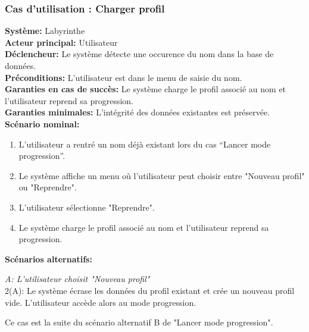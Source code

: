 \documentclass{butexFR}
\begin{document}
\subsubsection{Cas d'utilisation : Charger profil}
\textbf{Système:} Labyrinthe\\
\textbf{Acteur principal:} Utilisateur\\
\textbf{Déclencheur:} Le système détecte une occurence du nom dans la base de données.\\
\textbf{Préconditions:} L'utilisateur est dans le menu de saisie du nom.\\
\textbf{Garanties en cas de succès:} Le système charge le profil associé au nom et l'utilisateur reprend sa progression.\\
\textbf{Garanties minimales:} L'intégrité des données existantes est préservée.\\
\textbf{Scénario nominal:}
\begin{enumerate}
    \item L'utilisateur a rentré un nom déjà existant lors du cas ``Lancer mode progression''.
    \item Le système affiche un menu où l'utilisateur peut choisir entre "Nouveau profil" ou "Reprendre".
    \item L'utilisateur sélectionne "Reprendre".
    \item Le système charge le profil associé au nom et l'utilisateur reprend sa progression.
\end{enumerate}
\textbf{Scénarios alternatifs:}

\emph{A: L'utilisateur choisit "Nouveau profil"}\\
\hspace*{1em}2(A): Le système écrase les données du profil existant et crée un nouveau profil vide. L'utilisateur accède alors au mode progression.


Ce cas est la suite du scénario alternatif B de "Lancer mode progression".

\newpage
\end{document}
